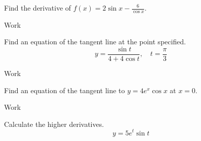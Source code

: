 \documentclass[12pt,addpoints, answers, fleqn]{exam}
\begin{document}
\begin{teacher}
\begin{questions}
Find the derivative of $f\left(x\right) = 2 \sin x - \displaystyle \frac{6}{\cos x}$.
\begin{solution}
Work
\end{solution}

\question 	%

Find an equation of the tangent line at the point specified.
\[
y = \frac{\sin t}{4 + 4 \cos t}, \quad t = \frac{\pi}{3}
\]
\begin{solution}
Work
\end{solution}
\question 	%

Find an equation of the tangent line to $y = 4e^x \cos x$ at $x = 0$.
\begin{solution}
Work
\end{solution}

\question 	%


\question 	%

Calculate the higher derivatives.
\[
y = 5e^t \sin t
\]


\end{questions}
\end{teacher}
\end{document}
